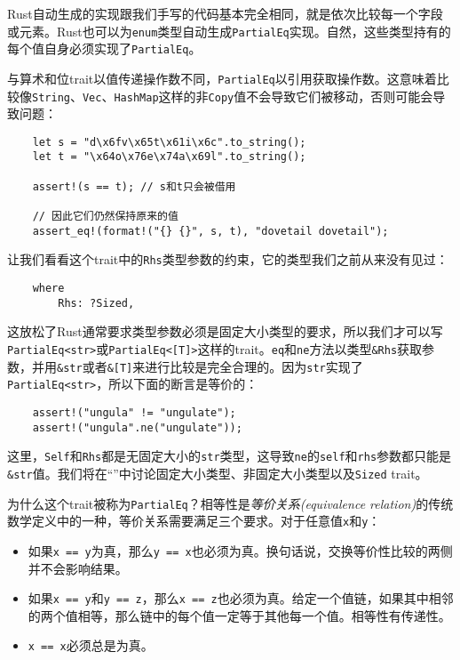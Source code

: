 Rust自动生成的实现跟我们手写的代码基本完全相同，就是依次比较每一个字段或元素。Rust也可以为\texttt{enum}类型自动生成\texttt{PartialEq}实现。自然，这些类型持有的每个值自身必须实现了\texttt{PartialEq}。

与算术和位trait以值传递操作数不同，\texttt{PartialEq}以引用获取操作数。这意味着比较像\texttt{String}、\texttt{Vec}、\texttt{HashMap}这样的非\texttt{Copy}值不会导致它们被移动，否则可能会导致问题：
\begin{verbatim}
    let s = "d\x6fv\x65t\x61i\x6c".to_string();
    let t = "\x64o\x76e\x74a\x69l".to_string();

    assert!(s == t); // s和t只会被借用

    // 因此它们仍然保持原来的值
    assert_eq!(format!("{} {}", s, t), "dovetail dovetail");
\end{verbatim}

让我们看看这个trait中的\texttt{Rhs}类型参数的约束，它的类型我们之前从来没有见过：
\begin{verbatim}
    where
        Rhs: ?Sized,
\end{verbatim}

这放松了Rust通常要求类型参数必须是固定大小类型的要求，所以我们才可以写\texttt{PartialEq<str>}或\texttt{PartialEq<[T]>}这样的trait。\texttt{eq}和\texttt{ne}方法以类型\texttt{\&Rhs}获取参数，并用\texttt{\&str}或者\texttt{\&[T]}来进行比较是完全合理的。因为\texttt{str}实现了\texttt{PartialEq<str>}，所以下面的断言是等价的：
\begin{verbatim}
    assert!("ungula" != "ungulate");
    assert!("ungula".ne("ungulate"));
\end{verbatim}

这里，\texttt{Self}和\texttt{Rhs}都是无固定大小的\texttt{str}类型，这导致\texttt{ne}的\texttt{self}和\texttt{rhs}参数都只能是\texttt{\&str}值。我们将在“”中讨论固定大小类型、非固定大小类型以及\texttt{Sized} trait。

为什么这个trait被称为\texttt{PartialEq}？相等性是\emph{等价关系(equivalence relation)}的传统数学定义中的一种，等价关系需要满足三个要求。对于任意值\texttt{x}和\texttt{y}：
\begin{itemize}
    \item 如果\texttt{x == y}为真，那么\texttt{y == x}也必须为真。换句话说，交换等价性比较的两侧并不会影响结果。
    \item 如果\texttt{x == y}和\texttt{y == z}，那么\texttt{x == z}也必须为真。给定一个值链，如果其中相邻的两个值相等，那么链中的每个值一定等于其他每一个值。相等性有传递性。
    \item \texttt{x == x}必须总是为真。
\end{itemize}

